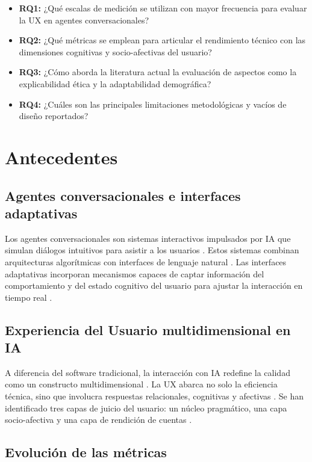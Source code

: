\documentclass[11pt,twocolumn]{article}
\begin{document}
\begin{itemize}[leftmargin=*, labelsep=5pt, itemsep=2pt]
    \item \textbf{RQ1:} ¿Qué escalas de medición se utilizan con mayor frecuencia para evaluar la UX en agentes conversacionales?
    \item \textbf{RQ2:} ¿Qué métricas se emplean para articular el rendimiento técnico con las dimensiones cognitivas y socio-afectivas del usuario?
    \item \textbf{RQ3:} ¿Cómo aborda la literatura actual la evaluación de aspectos como la explicabilidad ética y la adaptabilidad demográfica?
    \item \textbf{RQ4:} ¿Cuáles son las principales limitaciones metodológicas y vacíos de diseño reportados?
\end{itemize}

\section{Antecedentes}

\subsection{Agentes conversacionales e interfaces adaptativas}

Los agentes conversacionales son sistemas interactivos impulsados por IA que simulan diálogos intuitivos para asistir a los usuarios \cite{folstad2021}. Estos sistemas combinan arquitecturas algorítmicas con interfaces de lenguaje natural \cite{belda2023}. Las interfaces adaptativas incorporan mecanismos capaces de captar información del comportamiento y del estado cognitivo del usuario para ajustar la interacción en tiempo real \cite{brdnik2022}.

\subsection{Experiencia del Usuario multidimensional en IA}

A diferencia del software tradicional, la interacción con IA redefine la calidad como un constructo multidimensional \cite{marconi2026}. La UX abarca no solo la eficiencia técnica, sino que involucra respuestas relacionales, cognitivas y afectivas \cite{borsci2021}. Se han identificado tres capas de juicio del usuario: un núcleo pragmático, una capa socio-afectiva y una capa de rendición de cuentas \cite{marconi2026}.

\subsection{Evolución de las métricas}
\end{document}
